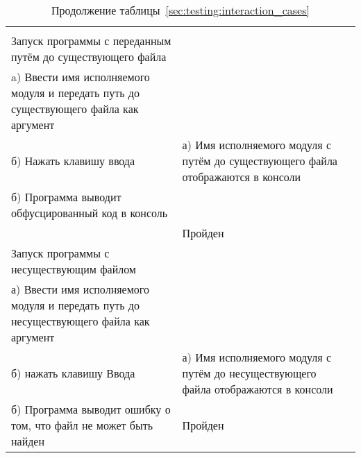 \begin{longtable}[l]{| >{\raggedright}m{}
                  | >{\raggedright}m{}
                  | >{\raggedright\arraybackslash}m{}|}

  \pagebreak
  \caption*{Продолжение таблицы~\ref{sec:testing:interaction_cases}} \\
   \hline
   \centering 1 & \centering 2 & \centering 3 \tabularnewline
   \hline

   Запуск программы с переданным путём до существующего файла \\
   a) Ввести имя исполняемого модуля и передать путь до существующего файла как аргумент \\
   б) Нажать клавишу ввода
   &
   а) Имя исполняемого модуля с путём до существующего файла отображаются в консоли \\
   б) Программа выводит обфусцированный код в консоль\\
   &
   Пройден\\
   \hline


   Запуск программы с несуществующим файлом \\
   а) Ввести имя исполняемого модуля и передать путь до несуществующего файла как аргумент \\
   б) нажать клавишу Ввода
   &
   а) Имя исполняемого модуля с путём до несуществующего файла отображаются в консоли \\
   б) Программа выводит ошибку о том, что файл не может быть найден
   &
   Пройден \\
   \hline


\end{longtable}

